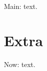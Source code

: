 \documentclass{article}
\begin{document}
Main:  text.
\appendix
\section{Extra}
Now:  text.
\end{document}
